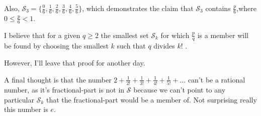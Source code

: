 \documentclass{article}
\begin{document}
Also, \(
\mathcal{S}_3
= \{
\frac{ 0}{6},
\frac{ 1}{6},
\frac{ 2}{6},
\frac{ 3}{6},
\frac{ 4}{6},
\frac{ 5}{6}
\}
\),
which demonstrates the claim that \(\mathcal{S}_3\)
contains \(\frac{p}{6}\),\newline where \(0 \le{} \frac{p}{6} < 1\).

I believe that for a given \(q \ge 2\) the smallest set \(\mathcal{S}_k\) for which \(\frac{p}{q}\)
is a member
will be found by choosing the smallest
\(k\) such that \(q\) divides \(k!\)\! .

However, I'll leave that proof for another day.

A final thought is that the number 
\(2\!+\!\frac{1}{2!}\!+\!\frac{1}{3!}\!+\!\frac{1}{4!}\!+\!\frac{1}{5!}\!+\!\dots{}\) can't
be a rational number, as it's fractional-part is not in \(\mathcal{S}\)
because we can't point to any particular \(\mathcal{S}_k\) that the fractional-part would be a member of.
Not surprising really this number is \(e\).
\end{document}

